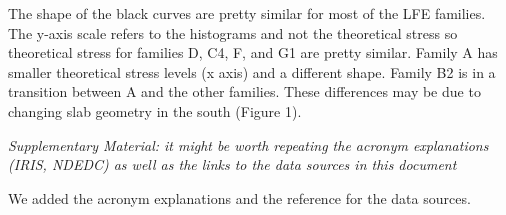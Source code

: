 \documentclass[letterpaper, 12pt]{article}
\begin{document}
\bigskip


The shape of the black curves are pretty similar for most of the LFE families.  The y-axis scale refers to the histograms and not the theoretical stress so theoretical stress for families D, C4, F, and G1 are pretty similar.  Family A has smaller theoretical stress levels (x axis) and a different shape.  Family B2 is in a transition between A and the other families. These differences may be due to changing slab geometry in the south (Figure 1).

\bigskip

\textit{Supplementary Material: it might be worth repeating the acronym explanations (IRIS, NDEDC) as well as the links to the data sources in this document}

\bigskip

We added the acronym explanations and the reference for the data sources.
\end{document}
